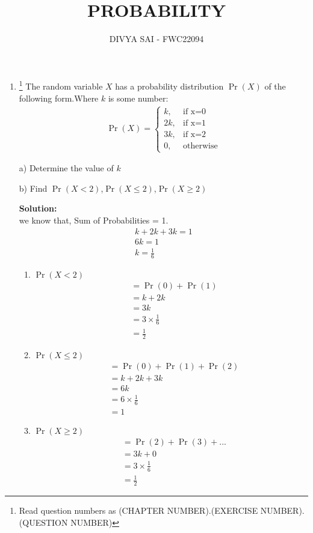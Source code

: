 \documentclass{article}
\providecommand{\pr}[1]{\ensuremath{\Pr\left(#1\right)}}
\newcommand{\solution}{\noindent \textbf{Solution: }}
\begin{document}
\title{PROBABILITY}
\author{\Large DIVYA SAI - FWC22094}
\date{}

\maketitle
\begin{enumerate}
[label=16.\arabic{enumi}.\arabic{enumii}]%
\setcounter{enumi}{3}
\setcounter{enumii}{10}

\item \footnote{Read question numbers as (CHAPTER NUMBER).(EXERCISE NUMBER).(QUESTION NUMBER)} {The random variable $X$ has a probability distribution \pr{X} of the following form.Where $k$ is some number: }
\begin{align}
  \pr{X} =
    \begin{cases}
      k,  & \text{if x=0}\\
      2k, & \text{if x=1}\\
      3k, & \text{if x=2}\\
      0 , & \text{otherwise}
    \end{cases}       
\end{align}

a) Determine the value of $k$ 

b) Find \pr{X < 2},\pr{X \leq 2},\pr{X \geq 2}  


\solution\\
we know that,
Sum of Probabilities = 1.
\begin{align}
&k + 2k + 3k  = 1 &\\
&6k = 1 &\\
&k = \frac{1}{6}&
\end{align}
 \begin{enumerate}
        \item \pr{X < 2}
          \begin{align}
          &= \pr{0}+\pr{1}\\
          &= k+2k\\
          &= 3k\\
          &=3\times\frac{1}{6}\\
          &= \frac{1}{2}
        \end{align}
        \item \pr{X \leq 2}
        \begin{align}
         &= \pr{0}+\pr{1}+\pr{2}\\
         &= k+2k+3k\\
         &= 6k\\
         &= 6 \times \frac{1}{6}\\
         &= 1
         \end{align}
        \item \pr{X \geq 2}
        \begin{align}
         &= \pr{2}+\pr{3}+...\\
          &= 3k+0\\
          &= 3 \times \frac{1}{6}\\
          & = \frac{1}{2}
        \end{align}     
\end{enumerate}
\end{enumerate}
\end{document}
